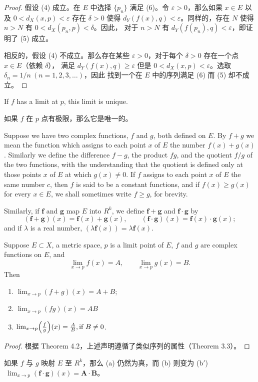 \documentclass[../poma-notes.tex]{subfiles}
\begin{document}
\begin{proof}
  假设 (4) 成立。在 $E$ 中选择 $\{p_n\}$ 满足 (6)。令 $\varepsilon > 0$，那么如果 $x\in E$ 以及 $0<d_X(x,p)<\varepsilon$
  存在 $\delta > 0$ 使得 $d_Y(f(x),q)<\varepsilon$。同样的，存在 $N$ 使得 $n > N$ 有 $0<d_X(p_n,p)<\delta$。因此，
  对于 $n > N$ 有 $d_Y(f(p_n),q) < \varepsilon$，即证明了 (5) 成立。

  相反的，假设 (4) 不成立。那么存在某些 $\varepsilon > 0$，对于每个 $\delta > 0$ 存在一个点 $x \in E$（依赖 $\delta$），
  满足 $d_Y(f(x),q)\ge\varepsilon$ 但是 $0<d_X(x,p)<\varepsilon$。选取 $\delta_n = 1/n\ (n=1,2,3,\dots)$，因此
  找到一个在 $E$ 中的序列满足 (6) 而 (5) 却不成立。
\end{proof}

\begin{corollary}
  If $f$ has a limit at $p$, this limit is unique.
\end{corollary}

\begin{anote}
  如果 $f$ 在 $p$ 点有极限，那么它是唯一的。
\end{anote}

\begin{definition}
  Suppose we have two complex functions, $f$ and $g$, both defined on $E$. By $f + g$ we mean the function which
  assigns to each point $x$ of $E$ the number $f(x) + g(x)$. Similarly we define the difference $f - g$, the
  product $fg$, and the quotient $f/g$ of the two functions, with the understanding that the quotient is defined
  only at those points $x$ of $E$ at which $g(x) \ne 0$. If $f$ assigns to each point $x$ of $E$ the same number
  $c$, then $f$ is said to be a constant functions, and if $f(x) \ge g(x)$ for every $x \in E$, we shall sometimes
  write $f \ge g$, for brevity.

  Similarly, if $\pmb{f}$ and $\pmb{g}$ map $E$ into $R^k$, we define $\pmb{f}+\pmb{g}$ and $\pmb{f}\cdot\pmb{g}$
  by
  \[
    (\pmb{f}+\pmb{g})(x)=\pmb{f}(x)+\pmb{g}(x),\qquad (\pmb{f}\cdot\pmb{g})(x)=\pmb{f}(x)\cdot\pmb{g}(x);
  \]
  and if $\lambda$ is a real number, $(\lambda\pmb{f}(x))=\lambda\pmb{f}(x)$.
\end{definition}

\begin{theorem}
  Suppose $E \subset X$, a metric space, $p$ is a limit point of $E$, $f$ and $g$ are complex functions on $E$, and
  \[
    \lim_{x \to p} f(x) = A, \qquad \lim_{x \to p} g(x) = B.
  \]
  Then
  \begin{enumerate}[label=(\alph*)]
    \item $\lim_{x \to p} (f+g)(x) = A + B$;
    \item $\lim_{x \to p} (fg)(x) = AB$
    \item $\lim_{x \to p} \Bigl(\frac{f}{g}\Bigr)(x) = \frac{A}{B}, \text{if } B \ne 0$.
  \end{enumerate}
\end{theorem}

\begin{proof}
  根据 Theorem 4.2，上述声明遵循了类似序列的属性（Theorem 3.3）。
\end{proof}

\begin{remark*}
  如果 $f$ 与 $g$ 映射 $E$ 至 $R^k$，那么 (a) 仍然为真，而 (b) 则变为
  (b$'$) $\ \lim_{x \to p}(\pmb{f}\cdot\pmb{g})(x) = \pmb{A}\cdot\pmb{B}$。
\end{remark*}
\end{document}
